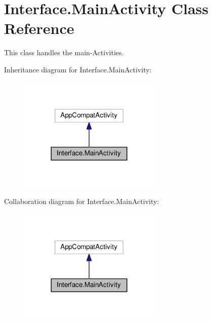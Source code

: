 \hypertarget{classInterface_1_1MainActivity}{}\section{Interface.\+Main\+Activity Class Reference}
\label{classInterface_1_1MainActivity}


This class handles the main-\/\+Activities.  




Inheritance diagram for Interface.\+Main\+Activity\+:
\nopagebreak
\begin{figure}[H]
\begin{center}
\leavevmode
\includegraphics[width=192pt]{classInterface_1_1MainActivity__inherit__graph}
\end{center}
\end{figure}


Collaboration diagram for Interface.\+Main\+Activity\+:
\nopagebreak
\begin{figure}[H]
\begin{center}
\leavevmode
\includegraphics[width=192pt]{classInterface_1_1MainActivity__coll__graph}
\end{center}
\end{figure}
